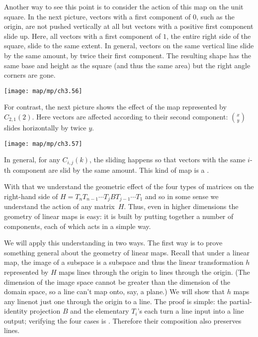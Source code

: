 Another way to see this point is to consider the action of this map 
on the unit square.
In the next picture,
vectors with a first component of $0$, such as the origin, are not pushed 
vertically at all but vectors with a positive first component slide up.
Here, all vectors with a first component of $1$, the entire 
right side of the square, slide to the same extent.
In general, vectors on the same vertical line slide by the same amount,
by twice their first component.
The resulting shape has the same base and height as the square
(and thus the same area) but the right angle corners are gone.
\begin{center}
  \texttt{[image: map/mp/ch3.56]}
\end{center}

For contrast, the next picture shows the effect of the map represented by 
$C_{2,1}(2)$.
Here vectors are affected according to their  
second component:
$\binom{x}{y}$ slides horizontally by twice $y$.
\begin{center}
  \texttt{[image: map/mp/ch3.57]}
\end{center}
In general, for any $C_{i,j}(k)$, the
sliding happens so that vectors with the same $i$-th component
are slid by the same amount.
This kind of map is a 
.

With that we understand the geometric effect of the four types 
of matrices on the right-hand side of
$H=T_nT_{n-1}\cdots T_jBT_{j-1}\cdots T_1$
and so in some sense we understand  
the action of any matrix~$H$.
Thus, even in higher dimensions the geometry of linear maps is easy: it 
is built by putting
together a number of components, each of which acts in a simple way.

We will apply this understanding in two ways.
The first way is to prove something general about 
the geometry of linear maps. 
Recall that under a linear map, the image of a subspace is a subspace
and thus the linear transformation $h$ represented by $H$ maps lines 
through the origin to lines through the origin.
(The dimension of the image space cannot be greater than 
the dimension of the domain space, so a line can't map onto, say, a plane.)
We will show that $h$ maps any line\Dash not just one through the origin\Dash 
to a line.
The proof is simple:
the partial-identity projection $B$ and the elementary $T_i$'s
each turn a line input into a line output; 
verifying the four cases is .
Therefore their composition also preserves lines.


